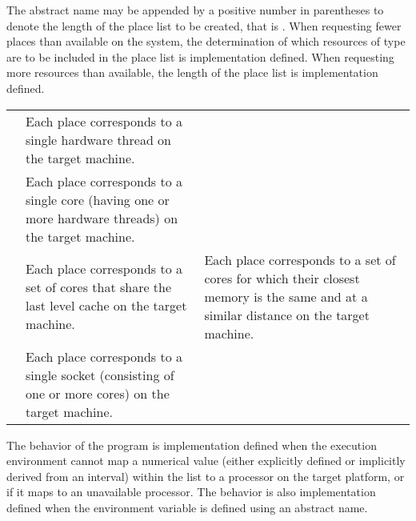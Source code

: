The abstract name may be appended by a positive number in parentheses
to denote the length of the place list to be created, that is
. When requesting fewer places than
available on the system, the determination of which resources of type
 are to be included in the place list is implementation
defined. When requesting more resources than available, the length of the
place list is implementation defined.

\medskip
\nolinenumbers
\renewcommand{\arraystretch}{1.5}
\tablelasttail{\hline}
\begin{supertabular}{p{1.5in} p{3.5in}}
{} & Each place corresponds to a single hardware
                    thread on the target machine.\\
{}   & Each place corresponds to a single core (having
                    one or more hardware threads) on the target machine.\\
{}     & Each place corresponds to a set of cores that 
                    share the last level cache on the target machine.
{} & Each place corresponds to a set of cores for
                    which their closest memory is the same and at a similar
                    distance on the target machine.\\ 
{} & Each place corresponds to a single socket (consisting
                    of one or more cores) on the target machine.\\
\end{supertabular}

\linenumbers

The behavior of the program is implementation defined when the execution
environment cannot map a numerical value (either explicitly defined or
implicitly derived from an interval) within the  list to
a processor on the target platform, or if it maps to an unavailable processor.
The behavior is also implementation defined when the 
environment variable is defined using an abstract name.


